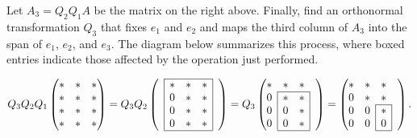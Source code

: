 %
%

Let $A_3 = Q_2Q_1A$ be the matrix on the right above.
Finally, find an orthonormal transformation $Q_3$ that fixes $e_1$ and $e_2$ and maps the third column of $A_3$ into the span of $e_1$, $e_2$, and $e_3$.
The diagram below summarizes this process, where boxed entries indicate those affected by the operation just performed.

\begin{equation*}
Q_3 Q_2 Q_1
\begin{pmatrix}
* & * & * \\
* & * & * \\
* & * & * \\
* & * & *
\end{pmatrix}
= Q_3 Q_2
\begin{pmatrix}  \cline{2-4}
&\lc{*} & * & \mc{*} & \\
&\lc{0} & * & \mc{*}& \\
&\lc{0} & * & \mc{*} & \\
&\lc{0}& * & \mc{*} & \\ \cline{2-4}
\end{pmatrix}
= Q_3
\begin{pmatrix}
* & * & * \\ \cline{2-3}
\mc{0} & * & \mc{*} \\
\mc{0} & 0 & \mc{*} \\
\mc{0} & 0 & \mc{*} & \\ \cline{2-3}
\end{pmatrix}
=
\begin{pmatrix}
* & * & * \\
0 & * & * \\ \cline{3-3}
0 & \mc{0} & \mc{*} \\
0 & \mc{0} & \mc{0} & \\ \cline{3-3}
\end{pmatrix}.
\end{equation*}

